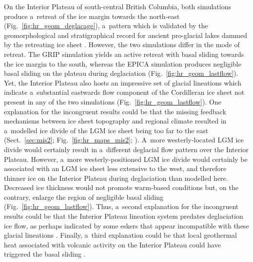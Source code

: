 \documentclass[tc, manuscript]{copernicus}
\begin{document}
      On the Interior Plateau of south-central British Columbia, both
      simulations produce a~retreat of the ice margin towards the north-east
      (Fig.~\ref{fig:hr_geom_deglacage}), a~pattern which is validated by
      the geomorphological and stratigraphical record for ancient
      pro-glacial lakes dammed by the retreating ice sheet
      \citep{Perkins.Brennand.2014}. However, the two simulations differ in
      the mode of retreat. The GRIP simulation yields an active retreat with
      basal sliding towards the ice margin to the south, whereas the EPICA
      simulation produces negligible basal sliding on the plateau during
      deglaciation (Fig.~\ref{fig:hr_geom_lastflow}). Yet, the Interior
      Plateau also hosts an impressive set of glacial lineations which
      indicate a~substantial eastwards flow component of the Cordilleran ice
      sheet \citep{Prest.etal.1968, Kleman.etal.2010} not present in any of
      the two simulations (Fig.~\ref{fig:hr_geom_lastflow}).
      One explanation for the
      incongruent results could be that the missing feedback mechanisms
      between ice sheet topography and regional climate resulted in
      a~modelled ice divide of the LGM ice sheet being too far to the east
      (Sect.~\ref{sec:mis2}; Fig.~\ref{fig:hr_maps_mis2};
      \citealp{Seguinot.etal.2014}). A~more westerly-located LGM ice divide
      would certainly result in a~different deglacial flow pattern over the
      Interior Plateau. However, a~more westerly-positioned LGM ice divide
      would certainly be associated with an LGM ice sheet less extensive to
      the west, and therefore thinner ice on the Interior Plateau during
      deglaciation than
      modelled here. Decreased ice thickness would not promote warm-based
      conditions but, on the contrary, enlarge the region of negligible
      basal sliding (Fig.~\ref{fig:hr_geom_lastflow}). Thus, a~second
      explanation for the incongruent results could be that the Interior
      Plateau lineation system predates deglaciation ice flow, as perhaps
      indicated by some eskers that appear incompatible with these glacial
      lineations \citep[Fig.~9]{Margold.etal.2013a}. Finally, a~third
      explanation could be that local geothermal heat associated with
      volcanic activity on the Interior Plateau could have triggered the
      basal sliding \citep[cf. Greenland ice
      sheet;][]{Fahnestock.etal.2001}.
\end{document}
